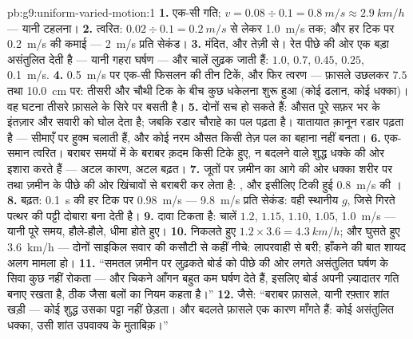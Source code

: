 \begin{solution}{pb:g9:uniform-varied-motion:1}
\textbf{1.} एक-सी गति; $v = 0.08 \div 0.1 = \qty{0.8}{m/s} \approx
\qty{2.9}{km/h}$ --- यानी टहलना।
\textbf{2.} त्वरित: $0.02 \div 0.1 = \qty{0.2}{m/s}$ से लेकर
\qty{1.0}{m/s} तक; और हर टिक पर \qty{0.2}{m/s} की कमाई ---
\qty{2}{m/s} प्रति सेकंड।
\textbf{3.} मंदित, और तेज़ी से। रेत पीछे की ओर एक बड़ा असंतुलित 
देती है --- यानी गहरा घर्षण --- और चालें लुढ़क जाती हैं: $1.0$, $0.7$,
$0.45$, $0.25$, \qty{0.1}{m/s}.
\textbf{4.} \qty{0.5}{m/s} पर एक-सी फिसलन की तीन टिकें, और फिर त्वरण
--- फ़ासले उछलकर $7.5$ तथा \qty{10.0}{cm} पर: तीसरी और चौथी टिक के
बीच कुछ धकेलना शुरू हुआ (कोई ढलान, कोई धक्का)। वह घटना तीसरे फ़ासले के
सिरे पर बसती है।
\textbf{5.} दोनों सच हो सकते हैं: औसत पूरे सफ़र भर के इंतज़ार और सवारी
को घोल देता है; जबकि रडार चौराहे का पल पढ़ता है। यातायात क़ानून रडार
पढ़ता है --- सीमाएँ  पर हुक्म चलाती हैं, और कोई नरम औसत
किसी तेज़ पल का बहाना नहीं बनता।
\textbf{6.} एक-समान त्वरित। बराबर समयों में  के बराबर क़दम किसी
टिके हुए, न बदलने वाले शुद्ध धक्के की ओर इशारा करते हैं --- अटल कारण,
अटल बढ़त।
\textbf{7.} जूतों पर ज़मीन का आगे की ओर धक्का शरीर पर  तथा ज़मीन के
पीछे की ओर खिंचावों से बराबरी कर लेता है: , और इसीलिए टिकी हुई
\qty{0.8}{m/s} की ।
\textbf{8.} बढ़त: \qty{0.1}{s} की हर टिक पर \qty{0.98}{m/s} ---
\qty{9.8}{m/s} प्रति सेकंड: वही स्थानीय $g$, जिसे गिरते पत्थर की
पट्टी दोबारा बना देती है।
\textbf{9.} दावा टिकता है: चालें $1.2$, $1.15$, $1.10$, $1.05$,
\qty{1.0}{m/s} --- यानी पूरे समय, हौले-हौले, धीमा होते हुए।
\textbf{10.} निकलते हुए $1.2 \times 3.6 = \qty{4.3}{km/h}$; और घुसते
हुए \qty{3.6}{km/h} --- दोनों साइकिल सवार की कसौटी से कहीं नीचे:
लापरवाही से बरी; हाँकने की बात शायद अलग मामला हो।
\textbf{11.} ``समतल ज़मीन पर लुढ़कते बोर्ड को पीछे की ओर लगते असंतुलित
घर्षण के सिवा कुछ नहीं रोकता --- और चिकने आँगन बहुत कम घर्षण देते हैं,
इसलिए बोर्ड अपनी ज़्यादातर गति बनाए रखता है, ठीक जैसा  बलों का
नियम कहता है।''
\textbf{12.} जैसे: ``बराबर फ़ासले, यानी रफ़्तार शांत खड़ी --- कोई शुद्ध
 उसका पट्टा नहीं छेड़ता। और बदलते फ़ासले एक कारण माँगते हैं: कोई
असंतुलित धक्का, उसी शांत उपवाक्य के मुताबिक़।''
\end{solution}
